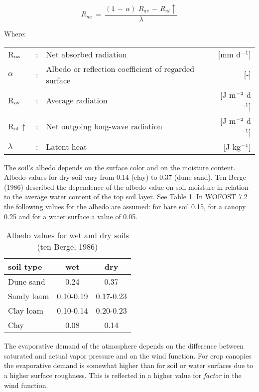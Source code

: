 \begin{equation}
\label{eq:AbsGlobRad}
R _{na} ~=~{\frac{(1\, -\, \alpha )\,\, R _{av} \, -\, R _{nl} \uparrow  }{\lambda}}
\end{equation}


Where:\\[5pt]
\begin{tabularx}{\textwidth}{llXr}
	R$_{{\rm na}}$ &:& Net absorbed radiation  & [mm d$^{{\rm -1}}$]\\
	$\alpha$ &:& Albedo or reflection coefficient of regarded surface  & [-]\\
	R$_{{\rm av}}$ &:& Average radiation  & [J m$^{{\rm -2}}$ d$^{{\rm -1}}$]\\
	R$_{{\rm nl}}$$\uparrow$ &:& Net outgoing long-wave radiation  & [J m$^{{\rm -2}}$ d$^{{\rm -1}}$]\\
	$\lambda$ &:& Latent heat  & [J kg$^{{\rm -1}}$]\\
\end{tabularx}


The soil's albedo depends on the surface color and on the moisture content. Albedo
values for dry soil vary from 0.14 (clay) to 0.37 (dune sand). Ten Berge (1986) described
the depen\-dence of the albedo value on soil moisture in relation to the average water
content of the top soil layer. See Table \ref{tab:AlbedoSoils}. 
In WOFOST 7.2 the following values for the albedo are assumed: for bare soil
0.15, for a canopy  0.25 and for a water surface a value of 0.05.

\begin{table}
	\centering
	\caption{Albedo values for wet and dry soils (ten Berge, 1986)}
	\label{tab:AlbedoSoils}
	\begin{tabular}{lcc}
		\hline
		soil type & wet & dry\\
		\hline
		Dune sand  &   0.24 &  0.37 \\
		Sandy loam &    0.10-0.19 &  0.17-0.23\\
		Clay loam &    0.10-0.14 &  0.20-0.23\\
		Clay &    0.08 &  0.14\\
		\hline
	\end{tabular}
\end{table}

The evaporative demand of the atmosphere depends on the difference between saturated
and actual vapor pressure and on the wind function. For crop canopies the evaporative
demand is somewhat higher than for soil or water surfaces due to a higher surface
roughness. This is reflected in a higher value for {\it factor} in the wind function.

